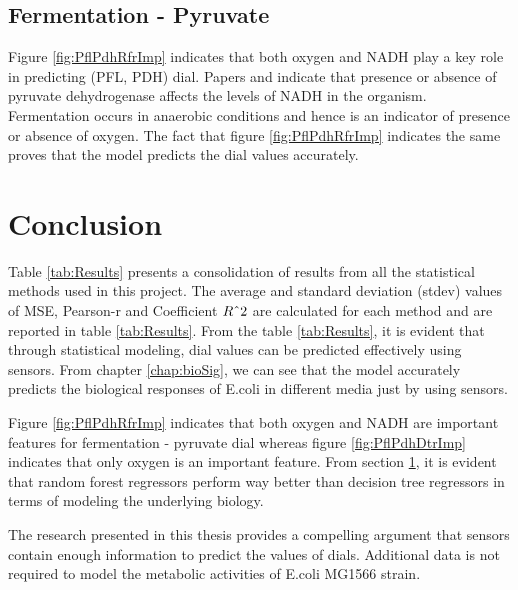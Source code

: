 \documentclass[12pt,chapterheads]{ucsd}
\begin{document}
\section{Fermentation - Pyruvate}\label{sec:pflpdhImp}
Figure \ref{fig:PflPdhRfrImp} indicates that both oxygen and NADH play a key role in predicting (PFL, PDH) dial. Papers \cite{pmid2655695} and \cite{pmid22343352} indicate that presence or absence of pyruvate dehydrogenase affects the levels of NADH in the organism. Fermentation occurs in anaerobic conditions and hence is an indicator of presence or absence of oxygen. The fact that figure \ref{fig:PflPdhRfrImp} indicates the same proves that the model predicts the dial values accurately.
\chapter{Conclusion}
Table \ref{tab:Results} presents a consolidation of results from all the statistical methods used in this project. The average and standard deviation (stdev) values of MSE, Pearson-r and Coefficient $R\string^2$ are calculated for each method and are reported in table \ref{tab:Results}. From the table \ref{tab:Results}, it is evident that through statistical modeling, dial values can be predicted effectively using sensors. From chapter \ref{chap:bioSig}, we can see that the model accurately predicts the biological responses of E.coli in different media just by using sensors. 

Figure \ref{fig:PflPdhRfrImp} indicates that both oxygen and NADH are important features for fermentation - pyruvate dial whereas figure \ref{fig:PflPdhDtrImp} indicates that only oxygen is an important feature. From section \ref{sec:pflpdhImp}, it is evident that random forest regressors perform way better than decision tree regressors in terms of modeling the underlying biology. 

The research presented in this thesis provides a compelling argument that sensors contain enough information to predict the values of dials. Additional data is not required to model the metabolic activities of E.coli MG1566 strain.
\end{document}
